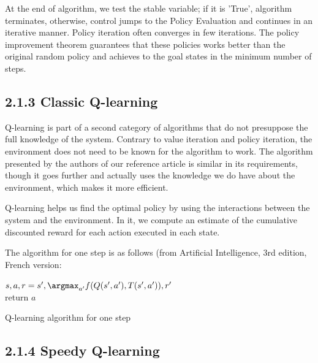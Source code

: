 \documentclass[a4paper, 12pt]{report}
\begin{document}
At the end of algorithm, we test the stable variable; if it is 'True', algorithm terminates, otherwise, control jumps to the Policy Evaluation and continues in an iterative manner. 
Policy iteration often converges in few iterations. The policy improvement theorem guarantees that these policies works better than the original random policy and achieves to the goal states in the minimum number of steps.

\subsection*{2.1.3 Classic Q-learning}

Q-learning is part of a second category of algorithms that do not presuppose the full knowledge of the system.
Contrary to value iteration and policy iteration, the environment does not need to be known for the algorithm to work.
The algorithm presented by the authors of our reference article is similar in its requirements, though it goes further and
actually uses the knowledge we do have about the environment, which makes it more efficient.

Q-learning helps us find the optimal policy by using the interactions between the system and the environment.
In it, we compute an estimate of the cumulative discounted reward for each action executed in each state.

The algorithm for one step is as follows (from Artificial Intelligence, 3rd edition, French version\cite{Russell-2010}:

\begin{algorithm}[H]
  $s,a,r=s',\argmax_{a'}f(Q(s',a'),T(s',a')),r'$\\
  return $a$
\caption{Q-learning algorithm for one step}
\end{algorithm}

\subsection*{2.1.4 Speedy Q-learning}
\end{document}
